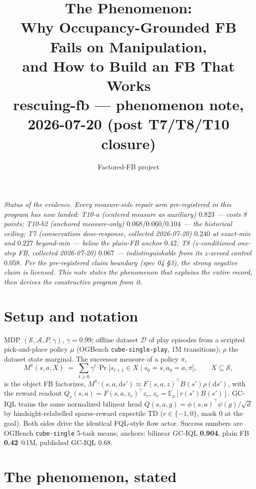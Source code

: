 \documentclass[11pt]{article}
\title{The Phenomenon:\\ Why Occupancy-Grounded FB Fails on Manipulation,\\ and How to Build an FB That Works\\
\large rescuing-fb --- phenomenon note, 2026-07-20 (post T7/T8/T10 closure)}
\author{Factored-FB project}
\date{}
\newcommand{\E}{\mathbb{E}}
\newcommand{\numgood}[1]{\textbf{\textcolor{green!45!black}{#1}}}
\newcommand{\numbad}[1]{\textbf{\textcolor{red!65!black}{#1}}}
\theoremstyle{definition}
\theoremstyle{remark}
\begin{document}
\maketitle

\noindent\emph{Status of the evidence. Every measure-side repair arm pre-registered in this
program has now landed: T10-a (centered measure as auxiliary) $0.823$ --- costs 8 points;
T10-b2 (anchored measure-only) $0.068/0.060/0.104$ --- the historical ceiling; T7 (conservatism
dose-response, collected 2026-07-20) $0.240$ at exact-min and $0.227$ beyond-min --- \emph{below}
the plain-FB anchor $0.42$; T8 ($z$-conditioned one-step FB, collected 2026-07-20)
$0.067$ --- indistinguishable from its $z$-zeroed control $0.058$. Per the pre-registered claim
boundary (spec 04 \S3), the strong negative claim is licensed. This note states the phenomenon
that explains the entire record, then derives the constructive program from it.}

\section{Setup and notation}\label{sec:setup}

MDP $(\mathcal S,\mathcal A,P,\gamma)$, $\gamma=0.99$; offline dataset $\mathcal D$ of play
episodes from a scripted pick-and-place policy $\mu$ (OGBench \texttt{cube-single-play}, 1M
transitions); $\rho$ the dataset state marginal. The successor measure of a policy $\pi$,
\begin{equation}
M^\pi(s,a,X)\;=\;\sum_{t\ge 0}\gamma^t\,\Pr\!\big[s_{t+1}\in X\mid s_0{=}s,a_0{=}a,\pi\big],
\qquad X\subseteq\mathcal S,
\label{eq:sm}
\end{equation}
is the object FB factorizes, $M^{\pi_z}(s,a,\mathrm ds')\approx F(s,a,z)^\top B(s')\rho(\mathrm
ds')$, with the reward readout $Q_r(s,a)=F(s,a,z_r)^\top z_r$, $z_r=\E_\rho[r(s')B(s')]$.
GC-IQL trains the same normalized bilinear head $Q(s,a,g)=\phi(s,a)^\top\psi(g)/\sqrt d$ by
hindsight-relabelled sparse-reward expectile TD ($r\in\{-1,0\}$, mask $0$ at the goal). Both
sides drive the identical FQL-style flow actor. Success numbers are OGBench
\texttt{cube-single} 5-task means; anchors: bilinear GC-IQL \numgood{0.904}, plain FB
\numbad{0.42} @1M, published GC-IQL 0.68.

\section{The phenomenon, stated}\label{sec:statement}
\end{document}
